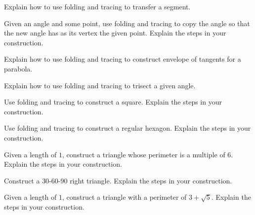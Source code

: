 \documentclass[nooutcomes]{ximera}
\begin{document}
\begin{problem}
Explain how to use folding and tracing to transfer a segment.
\end{problem}

\begin{problem}
Given an angle and some point, use folding and tracing to copy the angle so
  that the new angle has as its vertex the given point. Explain the
  steps in your construction.
\end{problem}

\begin{problem}
Explain how to use folding and tracing to construct envelope of tangents for
  a parabola.
\end{problem}

\begin{problem}
Explain how to use folding and tracing to trisect a given angle.
\end{problem}

\begin{problem}
Use folding and tracing to construct a square. Explain the steps in your construction.
\end{problem}

\begin{problem}
Use folding and tracing to construct a regular hexagon. Explain the steps in
  your construction.
\end{problem}


\begin{problem}
Given a length of $1$, construct a triangle whose perimeter is a
  multiple of $6$. Explain the steps in your construction.
\end{problem}

\begin{problem}
Construct a $30$-$60$-$90$ right triangle. Explain the steps in your
  construction.
\end{problem}

\begin{problem}
Given a length of $1$, construct a triangle with a perimeter of
  $3 + \sqrt{5}$. Explain the steps in your construction.
\end{problem}
\end{document}
